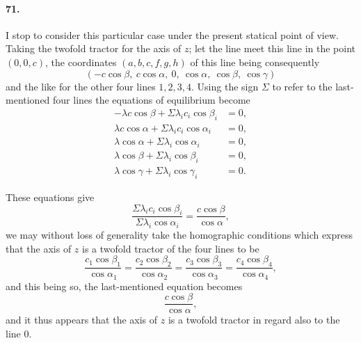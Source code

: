 \documentclass[11pt,a4paper]{article}
\begin{document}
\paragraph{71.}
I stop to consider this particular case under the present statical point of
view. Taking the twofold tractor for the axis of $z$; let the line meet this line in
the point $(0, 0, c)$, the coordinates $(a,b,c,f,g,h)$ of this line being consequently
\[
(-c \cos\beta,\ c \cos\alpha,\ 0,\ \cos\alpha,\ \cos\beta,\ \cos\gamma)
\]
and the like for the other four lines $1, 2, 3, 4$. Using the sign $\Sigma$ to refer to the
last-mentioned four lines the equations of equilibrium become
\begin{align*}
-\lambda c \cos\beta + \Sigma\lambda_i c_i \cos\beta_i &= 0, \\
\lambda c \cos\alpha + \Sigma\lambda_i c_i \cos\alpha_i &= 0, \\
\lambda \cos\alpha + \Sigma\lambda_i \cos\alpha_i &= 0, \\
\lambda \cos\beta + \Sigma\lambda_i \cos\beta_i &= 0, \\
\lambda \cos\gamma + \Sigma\lambda_i \cos\gamma_i &= 0.
\end{align*}

These equations give
\[
\frac{\Sigma\lambda_i c_i \cos\beta_i}{\Sigma\lambda_i \cos\alpha_i}
 = \frac{c\cos\beta}{\cos\alpha},
\]
we may without loss of generality take the homographic conditions which express that
the axis of $z$ is a twofold tractor of the four lines to be
\[
\frac{c_1\cos\beta_1}{\cos\alpha_1} = \frac{c_2\cos\beta_2}{\cos\alpha_2}
 = \frac{c_3\cos\beta_3}{\cos\alpha_3} = \frac{c_4\cos\beta_4}{\cos\alpha_4},
\]
and this being so, the last-mentioned equation becomes
\[
\frac{c\cos\beta}{\cos\alpha},
\]
and it thus appears that the axis of $z$ is a twofold tractor in regard also to the line $0$.
\end{document}
